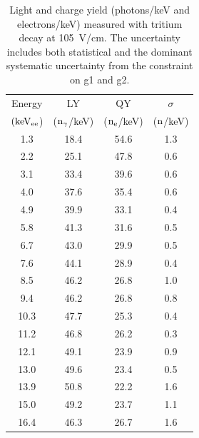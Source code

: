 \begin{table}[h!]
\centering
\begin{tabular}{|c|c|c|c|} \hline
Energy 	& 		LY	& 	QY	& $\sigma$ \\ 
$\rm (keV_{ee}$) & ($\rm n_\gamma$/keV)   & ($\rm n_e$/keV) & ($\rm n$/keV) \\ \hline
1.3 	 & 18.4 	 & 54.6 	 & 1.3 	 \\ \hline 
2.2 	 & 25.1 	 & 47.8 	 & 0.6 	 \\ \hline 
3.1 	 & 33.4 	 & 39.6 	 & 0.6 	 \\ \hline 
4.0 	 & 37.6 	 & 35.4 	 & 0.6 	 \\ \hline 
4.9 	 & 39.9 	 & 33.1 	 & 0.4 	 \\ \hline 
5.8 	 & 41.3 	 & 31.6 	 & 0.5 	 \\ \hline 
6.7 	 & 43.0 	 & 29.9 	 & 0.5 	 \\ \hline 
7.6 	 & 44.1 	 & 28.9 	 & 0.4 	 \\ \hline 
8.5 	 & 46.2 	 & 26.8 	 & 1.0 	 \\ \hline 
9.4 	 & 46.2 	 & 26.8 	 & 0.8 	 \\ \hline 
10.3 	 & 47.7 	 & 25.3 	 & 0.4 	 \\ \hline 
11.2 	 & 46.8 	 & 26.2 	 & 0.3 	 \\ \hline 
12.1 	 & 49.1 	 & 23.9 	 & 0.9 	 \\ \hline 
13.0 	 & 49.6 	 & 23.4 	 & 0.5 	 \\ \hline 
13.9 	 & 50.8 	 & 22.2 	 & 1.6 	 \\ \hline 
15.0 	 & 49.2 	 & 23.7 	 & 1.1 	 \\ \hline 
16.4 	 & 46.3 	 & 26.7 	 & 1.6 	 \\ \hline 
\end{tabular}
\caption{Light and charge yield (photons/keV and electrons/keV) measured with tritium decay at 105~V/cm. The uncertainty includes both statistical and the dominant systematic uncertainty from the constraint on g1 and g2. }
\label{table:Yields_100}
\end{table}


